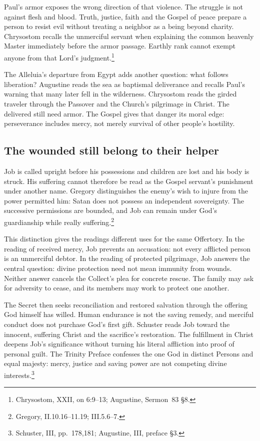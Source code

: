 Paul's armor exposes the wrong direction of that violence. The struggle is not against flesh and blood. Truth, justice, faith and the Gospel of peace prepare a person to resist evil without treating a neighbor as a being beyond charity. Chrysostom recalls the unmerciful servant when explaining the common heavenly Master immediately before the armor passage. Earthly rank cannot exempt anyone from that Lord's judgment.\footnote{Chrysostom,  XXII, on 6:9--13; Augustine, Sermon~83 \S8.}

The Alleluia's departure from Egypt adds another question: what follows liberation? Augustine reads the sea as baptismal deliverance and recalls Paul's warning that many later fell in the wilderness. Chrysostom reads the girded traveler through the Passover and the Church's pilgrimage in Christ. The delivered still need armor. The Gospel gives that danger its moral edge: perseverance includes mercy, not merely survival of other people's hostility.

\newpage
\subsection{The wounded still belong to their helper}
Job is called upright before his possessions and children are lost and his body is struck. His suffering cannot therefore be read as the Gospel servant's punishment under another name. Gregory distinguishes the enemy's wish to injure from the power permitted him: Satan does not possess an independent sovereignty. The successive permissions are bounded, and Job can remain under God's guardianship while really suffering.\footnote{Gregory,  II.10.16--11.19; III.5.6--7.}

This distinction gives the readings different uses for the same Offertory. In the reading of received mercy, Job prevents an accusation: not every afflicted person is an unmerciful debtor. In the reading of protected pilgrimage, Job answers the central question: divine protection need not mean immunity from wounds. Neither answer cancels the Collect's plea for concrete rescue. The family may ask for adversity to cease, and its members may work to protect one another.

The Secret then seeks reconciliation and restored salvation through the offering God himself has willed. Human endurance is not the saving remedy, and merciful conduct does not purchase God's first gift. Schuster reads Job toward the innocent, suffering Christ and the sacrifice's restoration. The fulfillment in Christ deepens Job's significance without turning his literal affliction into proof of personal guilt. The Trinity Preface confesses the one God in distinct Persons and equal majesty: mercy, justice and saving power are not competing divine interests.\footnote{Schuster,  III, pp.~178,181; Augustine,  III, preface \S3.}

